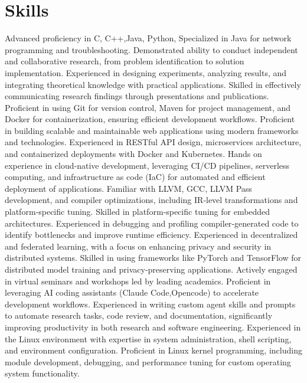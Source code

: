 \section{Skills}
  \resumeSubHeadingListStart
      {Advanced proficiency in C, C++,Java,  Python,  Specialized in Java for network programming and troubleshooting.}
      {Demonstrated ability to conduct independent and collaborative research, from problem identification to solution implementation. Experienced in designing experiments, analyzing results, and integrating theoretical knowledge with practical applications. Skilled in effectively communicating research findings through presentations and publications.}
      {Proficient in using Git for version control, Maven for project management, and Docker for containerization, ensuring efficient development workflows.}
      {Proficient in building scalable and maintainable web applications using modern frameworks and technologies. Experienced in RESTful API design, microservices architecture, and containerized deployments with Docker and Kubernetes.}
      {Hands on experience in cloud‑native development, leveraging CI/CD pipelines, serverless computing, and infrastructure as code (IaC) for automated and efficient deployment of applications.}
      {Familiar with LLVM, GCC, LLVM Pass development, and compiler optimizations, including IR‑level transformations and platform‑specific tuning. Skilled in platform‑specific tuning for embedded architectures. Experienced in debugging and profiling compiler‑generated code to identify bottlenecks and improve runtime efficiency.}
      {Experienced in decentralized and federated learning, with a focus on enhancing privacy and security in distributed systems. Skilled in using frameworks like PyTorch and TensorFlow for distributed model training and privacy‑preserving applications. Actively engaged in virtual seminars and workshops led by leading academics.}
      {Proficient in leveraging AI coding assistants (Claude Code,Opencode) to accelerate development workflows. Experienced in writing custom agent skills and prompts to automate research tasks, code review, and documentation, significantly improving productivity in both research and software engineering.}
      {Experienced in the Linux environment with expertise in system administration, shell scripting, and environment configuration. Proficient in Linux kernel programming, including module development, debugging, and performance tuning for custom operating system functionality.}
  \resumeSubHeadingListEnd